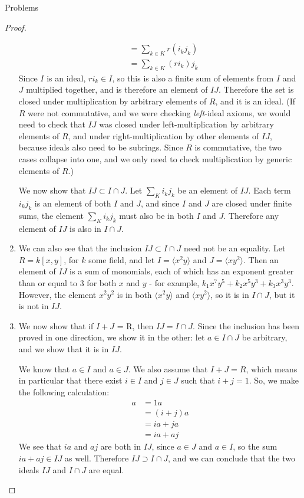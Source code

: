\documentclass[12pt]{article}
\theoremstyle{definition}
\begin{document}
\begin{section}{Problems}
\begin{proof}
\begin{enumerate}[label=(\alph*)]
\begin{align*}
        &= \sum_{k \in K} r\left (i_k j_k \right )\\
        &= \sum_{k \in K} \left ( r i_k \right ) j_k
    \end{align*}
    Since $I$ is an ideal, $ri_k \in I$, so this is also a finite sum of elements from $I$ and $J$ multiplied together, and is therefore an element of $IJ$. Therefore the set is closed under multiplication by arbitrary elements of $R$, and it is an ideal. (If $R$ were not commutative, and we were checking \textit{left}-ideal axioms, we would need to check that $IJ$ was closed under left-multiplication by arbitrary elements of $R$, and under right-multiplication by other elements of $IJ$, because ideals also need to be subrings. Since $R$ is commutative, the two cases collapse into one, and we only need to check multiplication by generic elements of $R$.)
    \par We now show that $IJ \subset I \cap J$. Let $\sum_K i_k j_k$ be an element of $IJ$. Each term $i_kj_k$ is an element of both $I$ and $J$, and since $I$ and $J$ are closed under finite sums, the element $\sum_K i_k j_k$ must also be in both $I$ and $J$. Therefore any element of $IJ$ is also in $I \cap J$.
    \item We can also see that the inclusion $IJ \subset I \cap J$ need not be an equality. Let $R = k[x,y]$, for $k$ some field, and let $I = \langle x^2 y \rangle$ and $J = \langle x y^2 \rangle$. Then an element of $IJ$ is a sum of monomials, each of which has an exponent greater than or equal to $3$ for both $x$ and $y$ - for example, $k_1 x^7y^5 + k_2 x^5y^3 + k_3 x^3y^3$. However, the element $x^2y^2$ is in both $\langle x^2 y \rangle $ and $\langle xy^2 \rangle$, so it is in $I \cap J$, but it is not in $IJ$.
    \item We now show that if $I+J$ = R, then $IJ = I \cap J$. Since the inclusion has been proved in one direction, we show it in the other: let $a \in I \cap J$ be arbitrary, and we show that it is in $IJ$.
    \par We know that $a \in I$ and $a \in J$. We also assume that $I + J = R$, which means in particular that there exist $i \in I$ and $j \in J$ such that $ i + j = 1$. So, we make the following calculation:
    \begin{align*}
        a &= 1a\\
        &= (i+j)a\\
        &= ia + ja\\
        &= ia +  aj
    \end{align*}
    We see that $ia$ and $aj$ are both in $IJ$, since $a \in J$ and $a \in I$, so the sum $ia + aj \in IJ$ as well. Therefore $IJ \supset I\cap J$, and we can conclude that the two ideals $IJ$ and $I \cap J$ are equal.

\end{enumerate}
\end{proof}
\end{section}
\end{document}
